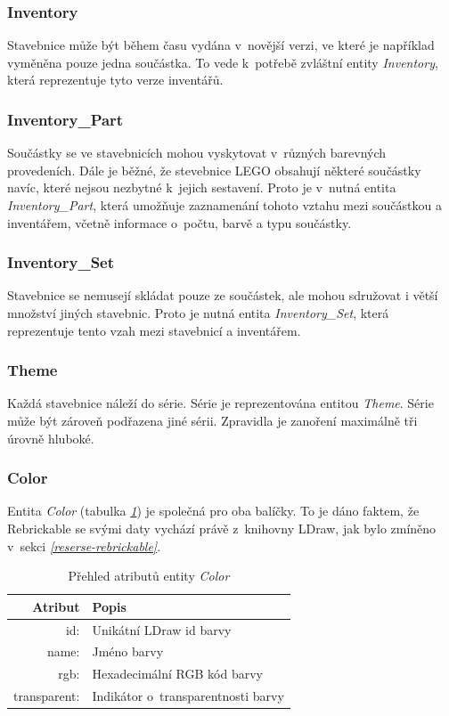 \subsubsection*{Inventory}
Stavebnice může být během času vydána v~novější verzi, ve které je například vyměněna pouze jedna součástka. To vede k~potřebě zvláštní entity \textit{Inventory}, která reprezentuje tyto verze inventářů. 

\subsubsection*{Inventory\_Part} 
Součástky se ve stavebnicích mohou vyskytovat v~různých barevných provedeních. Dále je běžné, že stevebnice LEGO obsahují některé součástky navíc, které nejsou nezbytné k~jejich sestavení. Proto je v~nutná entita \textit{Inventory\_Part}, která umožňuje zaznamenání tohoto vztahu mezi součástkou a inventářem, včetně informace o~počtu, barvě a typu součástky.

\subsubsection*{Inventory\_Set}
Stavebnice se nemusejí skládat pouze ze součástek, ale mohou sdružovat i větší množství jiných stavebnic. Proto je nutná entita \textit{Inventory\_Set}, která reprezentuje tento vzah mezi stavebnicí a inventářem.

\subsubsection*{Theme}
Každá stavebnice náleží do série. Série je reprezentována entitou \textit{Theme}. Série může být zároveň podřazena jiné sérii. Zpravidla je zanoření maximálně tři úrovně hluboké.

\subsubsection*{Color} 
Entita \textit{Color} (tabulka \emph{\ref{table:entity:color}}) je společná pro oba balíčky. To je dáno faktem, že Rebrickable se svými daty vychází právě z~knihovny LDraw, jak bylo zmíněno v~sekci \emph{\ref{reserse-rebrickable}}.

\begin{table}[th!]
  \centering
  \caption{Přehled atributů entity \textit{Color}}
  \label{table:entity:color}
  \begin{tabularx}{\textwidth}{@{}rX@{}}
  \toprule
  Atribut & Popis
  \\ \midrule
  id: & Unikátní LDraw id barvy \autocite{ldraw:colors}
  \\
  name: & Jméno barvy
  \\
  rgb: & Hexadecimální \gls{RGB} kód barvy 
  \\
  transparent: & Indikátor o~transparentnosti barvy
  \\
  \bottomrule
  \end{tabularx}
\end{table}

